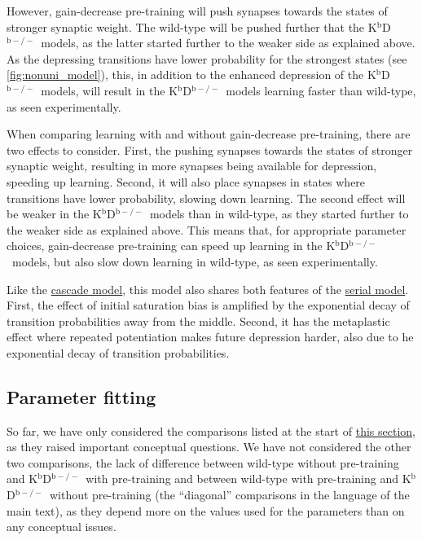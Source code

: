 \documentclass[10pt]{article}
\newcommand{\KO}{K$^\mathrm{b}$D$^{\mathrm{b}-/-}$}
\begin{document}
However, gain-decrease pre-training will push synapses towards the states of stronger synaptic weight.
The wild-type will be pushed further that the \KO\ models, as the latter started further to the weaker side as explained above. %
As the depressing transitions have lower probability for the strongest states (see \autoref{fig:nonuni_model}), this, in addition to the enhanced depression of the \KO\ models, will result in the \KO\ models learning faster than wild-type, as seen experimentally.

When comparing learning with and without gain-decrease pre-training, there are two effects to consider.
First, the pushing synapses towards the states of stronger synaptic weight, resulting in more synapses being available for depression, speeding up learning.
Second, it will also place synapses in states where transitions have lower probability, slowing down learning.
The second effect will be weaker in the \KO\ models than in wild-type, as they started further to the weaker side as explained above.
This means that, for appropriate parameter choices, gain-decrease pre-training can speed up learning in the \KO\ models, but also slow down learning in wild-type, as seen experimentally.

Like the \hyperref[sec:cascade]{cascade model}, this model also shares both features of the \hyperref[sec:multistate]{serial model}.
First, the effect of initial saturation bias is amplified by the exponential decay of transition probabilities away from the middle.
Second, it has the metaplastic effect where repeated potentiation makes future depression harder, also due to he exponential decay of transition probabilities.



\subsection{Parameter fitting}\label{sec:fit}

So far, we have only considered the comparisons listed at the start of \hyperref[sec:results]{this section}, as they raised important conceptual questions.
We have not considered the other two comparisons, the lack of difference between wild-type without pre-training and \KO\ with pre-training and between wild-type with pre-training and \KO\ without pre-training (the ``diagonal'' comparisons in the language of the main text), as they depend more on the values used for the parameters than on any conceptual issues.
\end{document}
